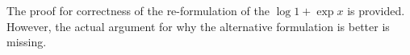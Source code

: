 \documentclass[a4paper]{article}
\begin{document}
The proof for correctness of the re-formulation of the $\log{1 + \exp{x}}$ is
provided. However, the actual argument for why the alternative formulation is
better is missing.





\end{document}
